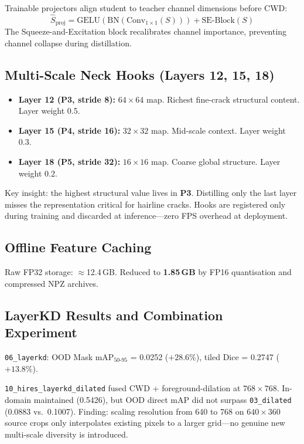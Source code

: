 \documentclass[12pt,a4paper]{article}
\begin{document}
Trainable projectors align student to teacher channel dimensions before CWD:
\[
\hat{S}_\text{proj}=\mathrm{GELU}(\mathrm{BN}(\mathrm{Conv}_{1\times1}(S)))+\mathrm{SE\text{-}Block}(S)
\]
The Squeeze-and-Excitation block recalibrates channel importance, preventing
channel collapse during distillation.

\subsection{Multi-Scale Neck Hooks (Layers 12, 15, 18)}

\begin{itemize}
  \item \textbf{Layer 12 (P3, stride 8):} $64\times64$ map. Richest fine-crack
    structural content. Layer weight 0.5.
  \item \textbf{Layer 15 (P4, stride 16):} $32\times32$ map. Mid-scale context.
    Layer weight 0.3.
  \item \textbf{Layer 18 (P5, stride 32):} $16\times16$ map. Coarse global
    structure. Layer weight 0.2.
\end{itemize}
Key insight: the highest structural value lives in \textbf{P3}. Distilling only
the last layer misses the representation critical for hairline cracks.
Hooks are registered only during training and discarded at inference---zero FPS
overhead at deployment.

\subsection{Offline Feature Caching}

Raw FP32 storage: $\approx$12.4\,GB. Reduced to \textbf{1.85\,GB} by FP16
quantisation and compressed NPZ archives.

\subsection{LayerKD Results and Combination Experiment}

\texttt{06\_layerkd}: OOD Mask mAP$_{50\text{-}95}$ = 0.0252 ($+28.6\%$),
tiled Dice = 0.2747 ($+13.8\%$).

\texttt{10\_hires\_layerkd\_dilated} fused CWD + foreground-dilation at
$768\times768$.
In-domain maintained (0.5426), but OOD direct mAP did not surpass
\texttt{03\_dilated} (0.0883 vs.\ 0.1007).
Finding: scaling resolution from 640 to 768 on $640\times360$ source crops
only interpolates existing pixels to a larger grid---no genuine new multi-scale
diversity is introduced.
\end{document}
